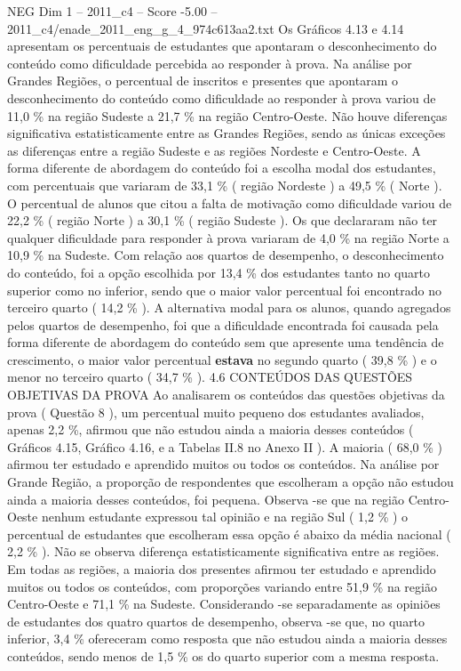 \begin{textsample}{NEG Dim 1 – 2011\_c4 – Score -5.00 – 2011\_c4/enade\_2011\_eng\_g\_4\_974c613aa2.txt}
Os Gráficos 4.13 e 4.14 apresentam os percentuais de estudantes que apontaram o desconhecimento do conteúdo como dificuldade percebida ao responder à prova.
Na análise por Grandes Regiões, o percentual de inscritos e presentes que apontaram o desconhecimento do conteúdo como dificuldade ao responder à prova variou de 11,0 \% na região Sudeste a 21,7 \% na região Centro-Oeste.
Não houve diferenças significativa estatisticamente entre as Grandes Regiões, sendo as únicas exceções as diferenças entre a região Sudeste e as regiões Nordeste e Centro-Oeste.
A forma diferente de abordagem do conteúdo foi a escolha modal dos estudantes, com percentuais que variaram de 33,1 \% ( região Nordeste ) a 49,5 \% ( Norte ).
O percentual de alunos que citou a falta de motivação como dificuldade variou de 22,2 \% ( região Norte ) a 30,1 \% ( região Sudeste ).
Os que declararam não ter qualquer dificuldade para responder à prova variaram de 4,0 \% na região Norte a 10,9 \% na Sudeste.
Com relação aos quartos de desempenho, o desconhecimento do conteúdo, foi a opção escolhida por 13,4 \% dos estudantes tanto no quarto superior como no inferior, sendo que o maior valor percentual foi encontrado no terceiro quarto ( 14,2 \% ).
A alternativa modal para os alunos, quando agregados pelos quartos de desempenho, foi que a dificuldade encontrada foi causada pela forma diferente de abordagem do conteúdo sem que apresente uma tendência de crescimento, o maior valor percentual \textbf{estava} no segundo quarto ( 39,8 \% ) e o menor no terceiro quarto ( 34,7 \% ). 4.6 CONTEÚDOS DAS QUESTÕES OBJETIVAS DA PROVA Ao analisarem os conteúdos das questões objetivas da prova ( Questão 8 ), um percentual muito pequeno dos estudantes avaliados, apenas 2,2 \%, afirmou que não estudou ainda a maioria desses conteúdos ( Gráficos 4.15, Gráfico 4.16, e a Tabelas II.8 no Anexo II ).
A maioria ( 68,0 \% ) afirmou ter estudado e aprendido muitos ou todos os conteúdos.
Na análise por Grande Região, a proporção de respondentes que escolheram a opção não estudou ainda a maioria desses conteúdos, foi pequena.
Observa -se que na região Centro-Oeste nenhum estudante expressou tal opinião e na região Sul ( 1,2 \% ) o percentual de estudantes que escolheram essa opção é abaixo da média nacional ( 2,2 \% ).
Não se observa diferença estatisticamente significativa entre as regiões.
Em todas as regiões, a maioria dos presentes afirmou ter estudado e aprendido muitos ou todos os conteúdos, com proporções variando entre 51,9 \% na região Centro-Oeste e 71,1 \% na Sudeste.
Considerando -se separadamente as opiniões de estudantes dos quatro quartos de desempenho, observa -se que, no quarto inferior, 3,4 \% ofereceram como resposta que não estudou ainda a maioria desses conteúdos, sendo menos de 1,5 \% os do quarto superior com a mesma resposta.

\end{textsample}
